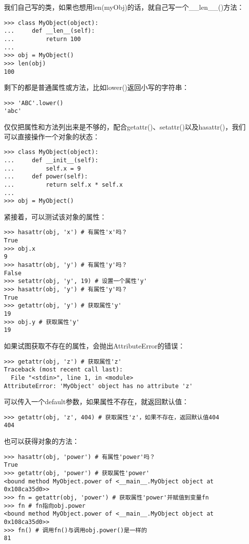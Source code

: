 \documentclass[twoside,11pt]{book}
\begin{document}
我们自己写的类，如果也想用len(myObj)的话，就自己写一个\_\_len\_\_()方法：
\begin{lstlisting}
>>> class MyObject(object):
...     def __len__(self):
...         return 100
...
>>> obj = MyObject()
>>> len(obj)
100
\end{lstlisting}

剩下的都是普通属性或方法，比如lower()返回小写的字符串：
\begin{lstlisting}
>>> 'ABC'.lower()
'abc'
\end{lstlisting}

仅仅把属性和方法列出来是不够的，配合getattr()、setattr()以及hasattr()，我们可以直接操作一个对象的状态：
\begin{lstlisting}
>>> class MyObject(object):
...     def __init__(self):
...         self.x = 9
...     def power(self):
...         return self.x * self.x
...
>>> obj = MyObject()
\end{lstlisting}

紧接着，可以测试该对象的属性：
\begin{lstlisting}
>>> hasattr(obj, 'x') # 有属性'x'吗？
True
>>> obj.x
9
>>> hasattr(obj, 'y') # 有属性'y'吗？
False
>>> setattr(obj, 'y', 19) # 设置一个属性'y'
>>> hasattr(obj, 'y') # 有属性'y'吗？
True
>>> getattr(obj, 'y') # 获取属性'y'
19
>>> obj.y # 获取属性'y'
19
\end{lstlisting}

如果试图获取不存在的属性，会抛出AttributeError的错误：
\begin{lstlisting}
>>> getattr(obj, 'z') # 获取属性'z'
Traceback (most recent call last):
  File "<stdin>", line 1, in <module>
AttributeError: 'MyObject' object has no attribute 'z'
\end{lstlisting}

可以传入一个default参数，如果属性不存在，就返回默认值：
\begin{lstlisting}
>>> getattr(obj, 'z', 404) # 获取属性'z'，如果不存在，返回默认值404
404
\end{lstlisting}

也可以获得对象的方法：
\begin{lstlisting}
>>> hasattr(obj, 'power') # 有属性'power'吗？
True
>>> getattr(obj, 'power') # 获取属性'power'
<bound method MyObject.power of <__main__.MyObject object at 0x108ca35d0>>
>>> fn = getattr(obj, 'power') # 获取属性'power'并赋值到变量fn
>>> fn # fn指向obj.power
<bound method MyObject.power of <__main__.MyObject object at 0x108ca35d0>>
>>> fn() # 调用fn()与调用obj.power()是一样的
81
\end{lstlisting}
\end{document}
